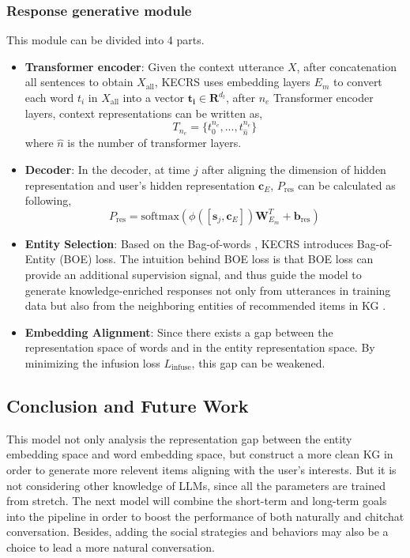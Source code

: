 \documentclass[11pt]{article}
\begin{document}
\subsubsection{Response generative module}
This module can be divided into 4 parts.
\begin{itemize}
    \item \textbf{Transformer encoder}: Given the context utterance $X$, after concatenation all sentences to obtain $X_{\text{all}}$, KECRS uses embedding layers $E_m$ to convert each word $t_i$ in $X_{\text{all}}$ into a vector $\mathbf{t_i}\in \mathbf{R}^{d_t}$, after $n_e$ Transformer encoder layers, context representations can be written as,
    \begin{equation}
        T_{n_e} = \{t_0^{n_e}, ..., t_{\hat{n}}^{n_e}\}
    \end{equation}
    where $\hat{n}$ is the number of transformer layers.
    
    \item \textbf{Decoder}: In the decoder, at time $j$ after aligning the dimension of hidden representation and user's hidden representation $\mathbf{c}_E$, $P_\text{res}$ can be calculated as following,
    \begin{equation}
        P_\text{res} = \text{softmax}(\phi([\mathbf{s}_j, \mathbf{c}_E])\mathbf{W}_{E_m}^T + \mathbf{b}_{\text{res}})
    \end{equation}

    \item \textbf{Entity Selection}: Based on the Bag-of-words \citet{ma2018bag}, KECRS introduces Bag-of-Entity (BOE) loss. The intuition behind BOE loss is that BOE loss can provide an additional supervision signal, and thus guide the model to generate knowledge-enriched responses not only from utterances in training data but also from the neighboring entities of recommended items in KG \citet{zhangKECRSKnowledgeEnrichedConversational2021}.

    \item \textbf{Embedding Alignment}: Since there exists a gap between the representation space of words and in the entity representation space.  By minimizing the infusion loss $L_{\text{infuse}}$, this gap can be weakened.


\end{itemize}


\subsection{Conclusion and Future Work}
This model not only analysis the representation gap between the entity embedding space and word embedding space, but construct a more clean KG in order to generate more relevent items aligning with the user's interests. But it is not considering other knowledge of LLMs, since all the parameters are trained from stretch. The next model will combine the short-term and long-term goals into the pipeline in order to boost the performance of both naturally and chitchat conversation. Besides, adding the social strategies and behaviors \citet{hayatiINSPIREDSociableRecommendation2020} may also be a choice to lead a more natural conversation.
\end{document}
